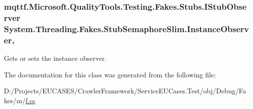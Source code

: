 \hypertarget{class_system_1_1_threading_1_1_fakes_1_1_stub_semaphore_slim_a448a4d7b7d9faaee432d5c66c5afc89e}{
\subsubsection[{Instance\-Observer}]{\setlength{\rightskip}{0pt plus 5cm}mqttf.\-Microsoft.\-Quality\-Tools.\-Testing.\-Fakes.\-Stubs.\-I\-Stub\-Observer System.\-Threading.\-Fakes.\-Stub\-Semaphore\-Slim.\-Instance\-Observer\hspace{0.3cm}{\ttfamily [get]}, {\ttfamily [set]}}}\label{class_system_1_1_threading_1_1_fakes_1_1_stub_semaphore_slim_a448a4d7b7d9faaee432d5c66c5afc89e}


Gets or sets the instance observer.



The documentation for this class was generated from the following file\-:\begin{DoxyCompactItemize}
\item 
D\-:/\-Projects/\-E\-U\-C\-A\-S\-E\-S/\-Crawler\-Framework/\-Service\-E\-U\-Cases.\-Test/obj/\-Debug/\-Fakes/m/\hyperlink{m_2f_8cs}{f.\-cs}\end{DoxyCompactItemize}
